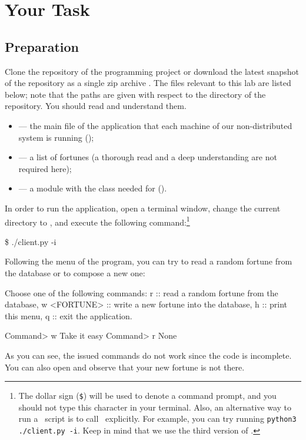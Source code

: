 \documentclass[a4paper,10pt]{article}
\begin{document}
\section{Your Task}
\subsection{Preparation} 
Clone the repository of the programming project or download the latest snapshot
of the repository as a single zip archive \cite{repository}. The files relevant
to this lab are listed below; note that the paths are given with respect to the
 directory of the repository. You should read and understand them.
\begin{itemize}

  \item {} --- the main file of the application that each
  machine of our non-distributed system is running (\leave);

  \item {} --- a list of fortunes (a thorough read
  and a deep understanding are not required here);

  \item {} --- a module with the
   class needed for  (\fix).

\end{itemize}

In order to run the application, open a terminal window, change the current
directory to , and execute the following command:\footnote{The
dollar sign (\texttt{\$}) will be used to denote a command prompt, and you
should not type this character in your terminal. Also, an alternative way to run
a \python\ script is to call \python\ explicitly. For example, you can try
running \texttt{python3 ./client.py -i}. Keep in mind that we use the third
version of \python.}

\begin{shell}
\$ ./client.py -i
\end{shell}
Following the menu of the program, you can try to read a random fortune from the
database or to compose a new one:
\begin{shell}
Choose one of the following commands:
    r            ::  read a random fortune from the database,
    w <FORTUNE>  ::  write a new fortune into the database,
    h            ::  print this menu,
    q            ::  exit the application.

Command> w Take it easy
Command> r
None
\end{shell}
As you can see, the issued commands do not work since the code is incomplete.
You can also open  and observe that your new fortune is not
there.
\end{document}
